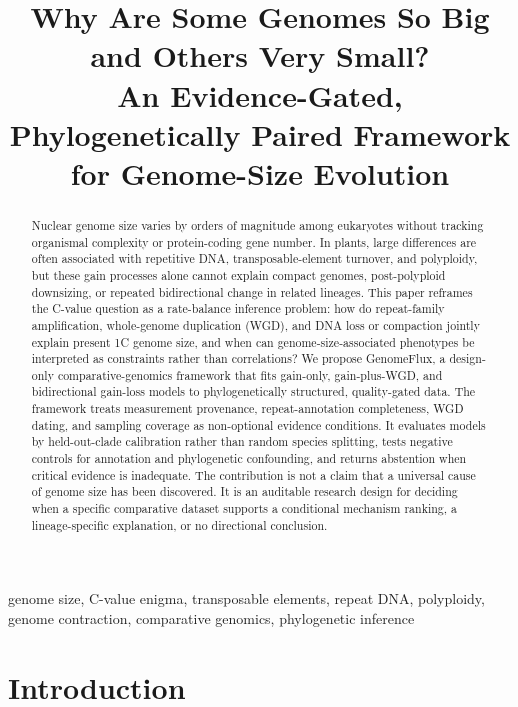 \documentclass[conference]{IEEEtran}
\begin{document}
\title{Why Are Some Genomes So Big and Others Very Small?\\
An Evidence-Gated, Phylogenetically Paired Framework for Genome-Size Evolution}

\author{}
\maketitle

\begin{abstract}
Nuclear genome size varies by orders of magnitude among eukaryotes without tracking organismal complexity or protein-coding gene number. In plants, large differences are often associated with repetitive DNA, transposable-element turnover, and polyploidy, but these gain processes alone cannot explain compact genomes, post-polyploid downsizing, or repeated bidirectional change in related lineages. This paper reframes the C-value question as a rate-balance inference problem: how do repeat-family amplification, whole-genome duplication (WGD), and DNA loss or compaction jointly explain present 1C genome size, and when can genome-size-associated phenotypes be interpreted as constraints rather than correlations? We propose GenomeFlux, a design-only comparative-genomics framework that fits gain-only, gain-plus-WGD, and bidirectional gain-loss models to phylogenetically structured, quality-gated data. The framework treats measurement provenance, repeat-annotation completeness, WGD dating, and sampling coverage as non-optional evidence conditions. It evaluates models by held-out-clade calibration rather than random species splitting, tests negative controls for annotation and phylogenetic confounding, and returns abstention when critical evidence is inadequate. The contribution is not a claim that a universal cause of genome size has been discovered. It is an auditable research design for deciding when a specific comparative dataset supports a conditional mechanism ranking, a lineage-specific explanation, or no directional conclusion.
\end{abstract}

\begin{IEEEkeywords}
genome size, C-value enigma, transposable elements, repeat DNA, polyploidy, genome contraction, comparative genomics, phylogenetic inference
\end{IEEEkeywords}

\section{Introduction}
\end{document}
